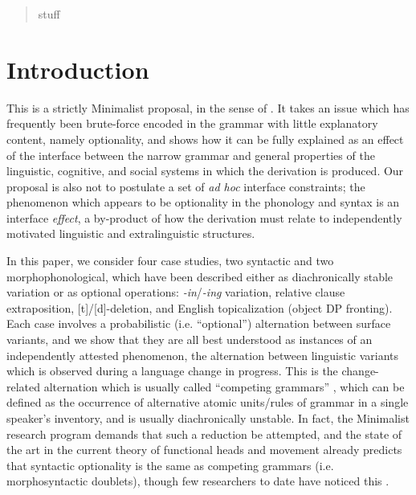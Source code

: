 \date{Received: date / Accepted: date}


\maketitle

\begin{abstract}
stuff
\end{abstract}

\section{Introduction}
\label{intro}

This is a strictly Minimalist proposal, in the sense of \citet{chomsky1993, chomsky1995, chomsky1998,chomsky2001}.
It takes an issue which has frequently been brute-force encoded in the grammar with little explanatory content, namely optionality, and shows how it can be fully explained as an effect of the interface between the narrow grammar and general properties of the linguistic, cognitive, and social systems in which the derivation is produced.
Our proposal is also not to postulate a set of \textsl{ad hoc} interface constraints; the phenomenon which appears to be optionality in the phonology and syntax is an interface \textsl{effect}, a by-product of how the derivation must relate to independently motivated linguistic and extralinguistic structures.

In this paper, we consider four case studies, two syntactic and two morphophonological, which have been described either as diachronically stable variation or as optional operations: \textsl{-in}/\textsl{-ing} variation, relative clause extraposition, [t]/[d]-deletion, and English topicalization (object DP fronting).
Each case involves a probabilistic (i.e. ``optional'') alternation between surface variants, and we show that they are all best understood as instances of an independently attested phenomenon, the alternation between linguistic variants which is observed during a language change in progress.
This is the change-related alternation which is usually called ``competing grammars'' \citep[][]{kroch1989}, which can be defined as the occurrence of alternative atomic units/rules of grammar in a single speaker's inventory, and is usually diachronically unstable.
In fact, the Minimalist research program demands that such a reduction be attempted, and the state of the art in the current  theory of functional heads and movement already predicts that syntactic optionality is the same as competing grammars (i.e. morphosyntactic doublets), though few researchers to date have noticed this \citep[with the exception of][]{kroch1994}.


